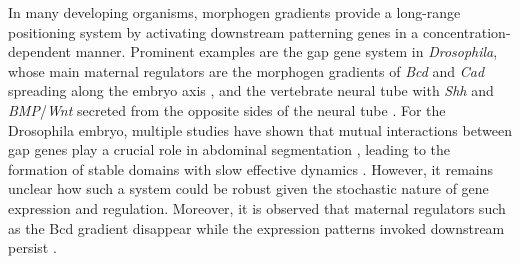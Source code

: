 \documentclass[a4paper,10pt]{article}
\newcommand{\TODO}[1]{\textcolor{blue}{\textbf{($\bigstar$ #1)}}}
\newcommand{\Drosophila}{{\it Drosophila}\xspace}
\newcommand{\Bcd}{{\it Bcd}\xspace}
\newcommand{\Cad}{{\it Cad}\xspace}
\begin{document}
In many developing organisms, morphogen gradients provide a long-range positioning system by activating downstream patterning genes in a concentration-dependent manner.
Prominent examples are the gap gene system in \Drosophila, whose main maternal regulators are the
morphogen gradients of \Bcd and \Cad spreading along the embryo axis \cite{Surkova2008, Jaeger2004, Driever1988a, Driever1988b, Frohnhofer1986, Struhl1989, Macdonald1986, Schulz1995, Mlodzik1987},
and the vertebrate neural tube with \emph{Shh} and \emph{BMP}/\emph{Wnt} secreted from the opposite sides of the neural tube \cite{Balaskas2012,Briscoe2015,Bier2015,Kuzmicz-Kowalska2020,Exelby2021,Minchington2023}.
For the Drosophila embryo, multiple studies have shown that mutual interactions between gap genes play a crucial role in abdominal segmentation \cite{Sokolowski2012,Jaeger2004,Dubuis2013,Manu2009PlosBiol,Surkova2008,Sokolowski2015,Kozlov2012,Crombach2012, Manu2009PlosCompBiol}, 
leading to the formation of stable domains with slow effective dynamics \cite{Vakulenko2009}. 
However, it remains unclear how such a system could be robust given the stochastic nature of gene expression and regulation. 
Moreover, it is observed that maternal regulators such as the Bcd gradient disappear while the expression patterns invoked downstream persist \cite{Surdej1998,Spirov2009}.
\end{document}
